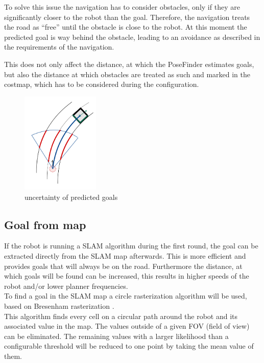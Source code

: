 To solve this issue the navigation has to consider obstacles, only if they are significantly closer to the robot than the goal. Therefore, the navigation treats the road as ``free'' until the obstacle is close to the robot. At this moment the predicted goal is way behind the obstacle, leading to an avoidance as described in the requirements of the navigation.

This does not only affect the distance, at which the PoseFinder estimates goals, but also the distance at which obstacles are treated as such and marked in the costmap, which has to be considered during the configuration.

\begin{figure}
\centering
	\includegraphics[width=0.33\textwidth]{Pictures/finding goal in obstacle}
	\caption{uncertainty of predicted goals }
	\label{goaluncertainty}
\end{figure}


\subsection{Goal from map}

If the robot is running a SLAM algorithm during the first round, the goal can be extracted directly from the SLAM map afterwards. This is more efficient and provides goals that will always be on the road. Furthermore the distance, at which goals will be found can be increased, this results in higher speeds of the robot and/or lower planner frequencies.\\

To find a goal in the SLAM map a circle rasterization algorithm will be used, based on Bresenham rasterization \cite{ComputerGraphics}.\\

This algorithm finds every cell on a circular path around the robot and its associated value in the map. The values outside of a given FOV (field of view) can be eliminated. The remaining values with a larger likelihood than a configurable threshold will be reduced to one point by taking the mean value of them.\\

